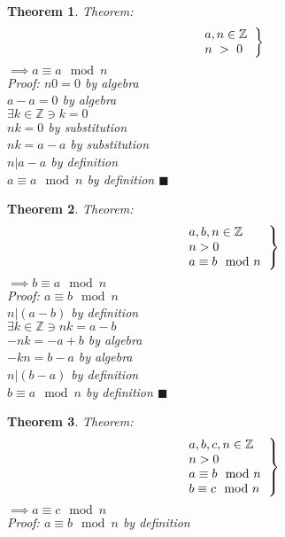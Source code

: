 \documentclass{article}
\newtheorem{theorem}{Theorem}[section]
\begin{document}
\begin{theorem}
	Theorem:
	\[\left . 
		\begin{tabular}{l}
			$a,n \in \mathbb{Z}$\\
			$n~>~0$\\
		\end{tabular}
	\right \}\]
$\implies a \equiv a \mod{n}$\\
Proof:	$ n0=0$ by algebra\\
$ a-a = 0$ by algebra\\
$\exists k \in \mathbb{Z} \ni k=0$\\
$ nk = 0$ by substitution\\
$ nk = a-a$ by substitution\\
$ n|a-a$ by definition\\
$ a \equiv a \mod{n}$ by definition $\blacksquare$\\
\end{theorem}\begin{theorem}
	Theorem:
	\[\left .
		\begin{tabular}{l}
			$a,b,n \in \mathbb{Z}$\\
			$n > 0$\\
			$a \equiv b \mod{n}$
		\end{tabular}
	\right \}\]
$\implies b \equiv a \mod{n}$\\
Proof: $a \equiv b \mod{n}$\\
$n|(a-b)$ by definition\\
$\exists k \in \mathbb{Z} \ni nk=a-b$\\
$-nk=-a+b$ by algebra\\
$-kn=b-a$ by algebra\\
$n|(b-a)$ by definition\\
$b \equiv a \mod{n}$ by definition $\blacksquare$\\
\end{theorem}\begin{theorem}
	Theorem:
	\[\left .
		\begin{tabular}{l}
			$a,b,c,n \in \mathbb{Z}$\\
			$n > 0$\\
			$a \equiv b \mod{n}$\\
			$b \equiv c \mod{n}$\\
		\end{tabular}
	\right \}\]
$\implies a \equiv c \mod{n}$\\
Proof: $a \equiv b \mod{n}$ by definition\\

\end{theorem}
\end{document}
